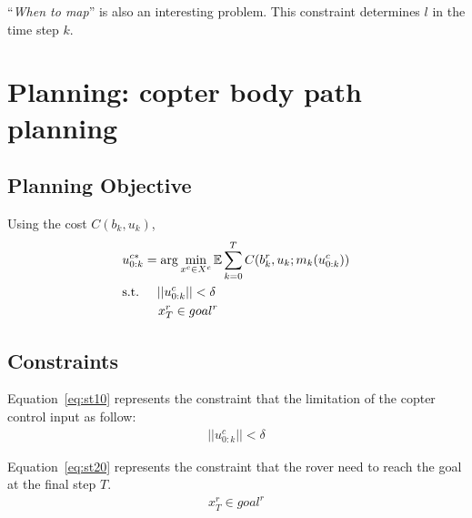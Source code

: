 \documentclass[conference]{IEEEtran}
\begin{document}
``{\it When to map}'' is also an interesting problem. This constraint determines $l$ in the time step $k$.

\section{Planning: copter body path planning}
\subsection{Planning Objective}
Using the cost $C(b_k, u_k)$,
\begin{align}
    &u^{c*}_{0:k}=\arg\min_{x^c \in X^c} \mathbb{E} \sum^T_{k=0} C(b^r_k, u_k; m_k (u^c_{0:k}))\\
    &{\rm s.t.} \hspace{5mm} ||u^c_{0:k}||< \delta\label{eq:st10}\\
    &\hspace{10mm} x^r_T \in goal^r\label{eq:st20}
\end{align}


\subsection{Constraints}

Equation~\eqref{eq:st10} represents the constraint that the limitation of the copter control input as follow:
\begin{align}
    ||u^c_{0:k}||< \delta
\end{align}

Equation~\eqref{eq:st20} represents the constraint that the rover need to reach the goal at the final step $T$.
\begin{align}
    x^r_T \in goal^r
\end{align}
\end{document}
